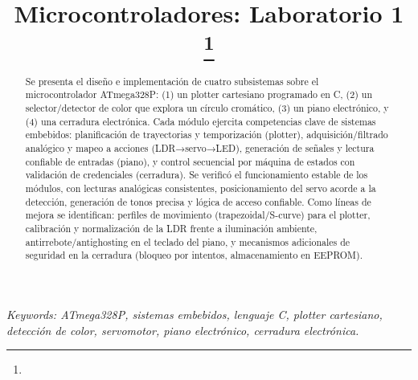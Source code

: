 \documentclass[conference]{IEEEtran}
\begin{document}
\title{Microcontroladores: Laboratorio 1\\
{\footnotesize \textsuperscript{}
}
\thanks{}
}

\author{
\and
{}
}
\maketitle


\begin{abstract}
Se presenta el diseño e implementación de cuatro subsistemas sobre el microcontrolador ATmega328P: (1) un plotter cartesiano programado en C, (2) un selector/detector de color que explora un círculo cromático, (3) un piano electrónico, y (4) una cerradura electrónica.
Cada módulo ejercita competencias clave de sistemas embebidos: planificación de trayectorias y temporización (plotter), adquisición/filtrado analógico y mapeo a acciones (LDR→servo→LED), generación de señales y lectura confiable de entradas (piano), y control secuencial por máquina de estados con validación de credenciales (cerradura).
Se verificó el funcionamiento estable de los módulos, con lecturas analógicas consistentes, posicionamiento del servo acorde a la detección, generación de tonos precisa y lógica de acceso confiable. Como líneas de mejora se identifican: perfiles de movimiento (trapezoidal/S-curve) para el plotter, calibración y normalización de la LDR frente a iluminación ambiente, antirrebote/antighosting en el teclado del piano, y mecanismos adicionales de seguridad en la cerradura (bloqueo por intentos, almacenamiento en EEPROM).
\end{abstract}

\textit{Keywords: ATmega328P, sistemas embebidos, lenguaje C, plotter cartesiano, detección de color, servomotor, piano electrónico, cerradura electrónica.}










            

\nocite{*}



\end{document}

